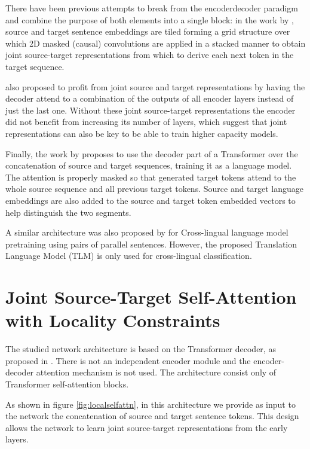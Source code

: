 \documentclass[11pt,a4paper]{article}
\begin{document}
There have been previous attempts to break from the
encoder\textendash decoder paradigm and combine the purpose of both
elements into a single block:
in the work by , source and target
sentence embeddings are tiled forming a grid structure over which 2D
masked (causal) convolutions are applied in a stacked manner
to obtain joint source-target representations
from which to derive each next token in the target sequence.

\cite{bapna2018transpattn} also proposed to profit from joint source
and target representations by having the decoder attend to a combination
of the outputs of all encoder layers instead of just the last one.
Without these joint source-target representations the encoder
did not benefit from increasing its number of layers, which suggest
that joint representations can also be key to be able to train
higher capacity models.

Finally, the work by  proposes to use the
decoder part of a Transformer over the concatenation of source and
target sequences, training it as a language model. The attention is
properly masked so that generated target tokens attend to the whole source
sequence and all previous target tokens. Source and target language
embeddings are also added to the source and target token
embedded vectors to help distinguish the two segments.

A similar architecture was also proposed by \cite{lample2019cross} for 
Cross-lingual language model pretraining using pairs of parallel sentences.
However, the proposed Translation Language Model (TLM) is only used 
for cross-lingual classification.


\section{Joint Source-Target Self-Attention with Locality Constraints}
\label{sec:approach}

The studied network architecture is based on the Transformer decoder,
as proposed in \cite{he2018layerwise}. There is
not an independent encoder module and the encoder-decoder attention mechanism is not used.
The architecture consist only of Transformer self-attention blocks.

As shown in figure \ref{fig:localselfattn}, in this architecture we provide
as input to the network the concatenation of source and target sentence
tokens. This design allows the network to learn joint source-target
representations from the early layers.
\end{document}
